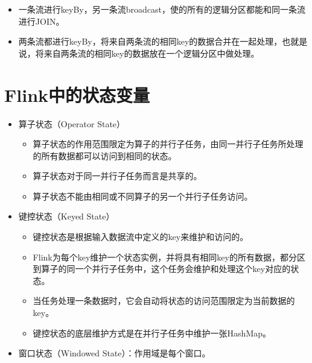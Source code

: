 \begin{itemize}
\begin{itemize}
    \begin{itemize}
    \tightlist
    \item
      一条流进行keyBy，另一条流broadcast，使的所有的逻辑分区都能和同一条流进行JOIN。
    \item
      两条流都进行keyBy，将来自两条流的相同key的数据合并在一起处理，也就是说，将来自两条流的相同key的数据放在一个逻辑分区中做处理。
    \end{itemize}
  \end{itemize}
\end{itemize}

\begin{Shaded}
\begin{Highlighting}[]
 \OperatorTok{*} \OperatorTok{=}\NormalTok{;}
\end{Highlighting}
\end{Shaded}

\hypertarget{flinkux4e2dux7684ux72b6ux6001ux53d8ux91cf}{%
\section{Flink中的状态变量}\label{flinkux4e2dux7684ux72b6ux6001ux53d8ux91cf}}

\begin{itemize}
\tightlist
\item
  算子状态（Operator State）

  \begin{itemize}
  \tightlist
  \item
    算子状态的作用范围限定为算子的并行子任务，由同一并行子任务所处理的所有数据都可以访问到相同的状态。
  \item
    算子状态对于同一并行子任务而言是共享的。
  \item
    算子状态不能由相同或不同算子的另一个并行子任务访问。
  \end{itemize}
\item
  键控状态（Keyed State）

  \begin{itemize}
  \tightlist
  \item
    键控状态是根据输入数据流中定义的key来维护和访问的。
  \item
    Flink为每个key维护一个状态实例，并将具有相同key的所有数据，都分区到算子的同一个并行子任务中，这个任务会维护和处理这个key对应的状态。
  \item
    当任务处理一条数据时，它会自动将状态的访问范围限定为当前数据的key。
  \item
    键控状态的底层维护方式是在并行子任务中维护一张HashMap。
  \end{itemize}
\item
  窗口状态（Windowed State）：作用域是每个窗口。
\end{itemize}

